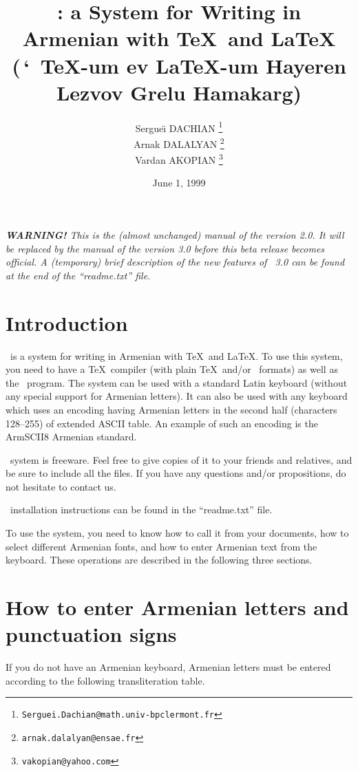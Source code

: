 \documentclass[12pt,a4paper,draft]{article}
\title{\latArmTeX: a System for Writing in Armenian with \TeX\ and \LaTeX\\
{\normalsize\artm (\ArmTeX$\,$` $\,${\aroff \TeX}-um ev {\aroff \LaTeX}-um
Hayeren Lezvov Grelu Hamakarg)}}
\author{%
Sergue\"{\i} DACHIAN \thanks{{\tt Serguei.Dachian@math.univ-bpclermont.fr}}\\
Arnak DALALYAN \thanks{{\tt arnak.dalalyan@ensae.fr}}\\
Vardan AKOPIAN \thanks{{\tt vakopian@yahoo.com}}
}
\date{June 1, 1999}
\def\myindent{\leavevmode}
\begin{document}
\maketitle


\vglue -12cm
\noindent
%
\textsl{\textbf{WARNING!} This is the (almost unchanged) manual of the version
  2.0. It will be replaced by the manual of the version 3.0 before this beta
  release becomes official. A (temporary) brief description of the new
  features of \latArmTeX~3.0 can be found at the end of the ``readme.txt''
  file.}
%
\vglue 10.43cm


\section{Introduction}

\myindent \latArmTeX\ is a system for writing in Armenian with \TeX\ and
\LaTeX. To use this system, you need to have a \TeX\ compiler (with plain
\TeX\ and/or \LaTeXe\ formats) as well as the \MF\ program. The system can be
used with a standard Latin keyboard (without any special support for Armenian
letters). It can also be used with any keyboard which uses an encoding having
Armenian letters in the second half (characters 128--255) of extended ASCII
table. An example of such an encoding is the ArmSCII8 Armenian standard.

\latArmTeX\ system is freeware. Feel free to give copies of it to your friends
and relatives, and be sure to include all the files. If you have any questions
and/or propositions, do not hesitate to contact us.

\latArmTeX\ installation instructions can be found in the ``readme.txt'' file.

To use the system, you need to know how to call it from your documents, how to
select different Armenian fonts, and how to enter Armenian text from the
keyboard. These operations are described in the following three sections.


\section{How to enter Armenian letters and punctuation signs}
\label{s2}

\myindent If you do not have an Armenian keyboard, Armenian letters must be
entered according to the following transliteration table.
\end{document}
